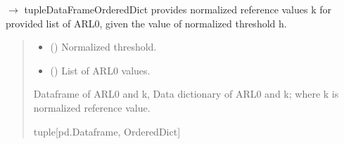 \documentclass[letterpaper,10pt,oneside,english]{sphinxmanual}
\begin{document}
\begin{fulllineitems}
\label{\detokenize{ref_theoretical:package.ARLTheoretical.get_ref_value}}
\pysigstartsignatures
\pysiglinewithargsret
{}
{\sphinxparamcomma {}}
{{ $\rightarrow$ tuple\DUrole{p}{{[}}DataFrameOrderedDict\DUrole{p}{{]}}}}
\pysigstopsignatures
\sphinxAtStartPar
provides normalized reference values k for provided list of ARL0, given the value of normalized threshold h.
\begin{quote}\begin{description}
\begin{itemize}
\item {} 
\sphinxAtStartPar
{} () \textendash{} Normalized threshold.

\item {} 
\sphinxAtStartPar
{} () \textendash{} List of ARL0 values.

\end{itemize}

\sphinxAtStartPar
Dataframe of ARL0 and k, Data dictionary of ARL0 and k; where k is normalized reference value.

\sphinxAtStartPar
tuple{[}pd.Dataframe, OrderedDict{]}

\end{description}\end{quote}

\end{fulllineitems}

\end{document}
